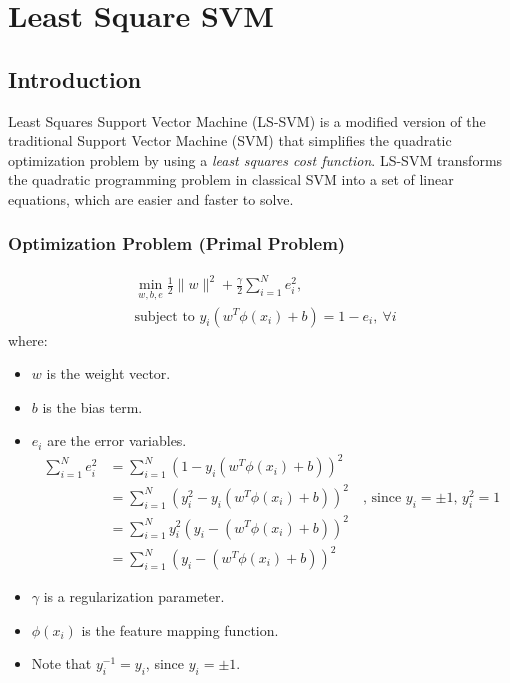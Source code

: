 \chapter{Least Square SVM}
\label{ch:ls_svm}

\section{Introduction}
Least Squares Support Vector Machine (LS-SVM) is a modified version of the traditional Support Vector Machine (SVM) that simplifies the quadratic optimization problem by using a \textit{least squares cost function}. LS-SVM transforms the quadratic programming problem in classical SVM into a set of linear equations, which are easier and faster to solve. 

\subsection{Optimization Problem (Primal Problem)}

\begin{align*}
   &\min_{w, b, e} \frac{1}{2} \lVert w\rVert^2 + \frac{\gamma}{2} \sum_{i=1}^N e_i^2,\\
   &\text{subject to } y_i (w^T \phi(x_i) + b) = 1 - e_i, \ \forall i
\end{align*}
where:
\begin{itemize}
   \item $w$ is the weight vector.
   \item $b$ is the bias term.
   \item $e_i$ are the error variables. 
\begin{align*}
	\sum_{i=1}^N e_i^2 &= \sum_{i=1}^N \left(1-y_i (w^T \phi(x_i) + b)\right)^2\\
					   &= \sum_{i=1}^N \left(y_i^2-y_i (w^T \phi(x_i) + b)\right)^2 \quad \text{, since } y_i = \pm 1, \, y_i^2 = 1\\
					   &= \sum_{i=1}^N y_i^2\left(y_i-(w^T \phi(x_i) + b)\right)^2\\
					   &= \sum_{i=1}^N \left(y_i-(w^T \phi(x_i) + b)\right)^2
\end{align*}
   \item $\gamma$ is a regularization parameter.
   \item $\phi(x_i)$ is the feature mapping function.
   \item Note that $y_i^{-1} = y_i$, since $y_i = \pm 1$. 
\end{itemize}

